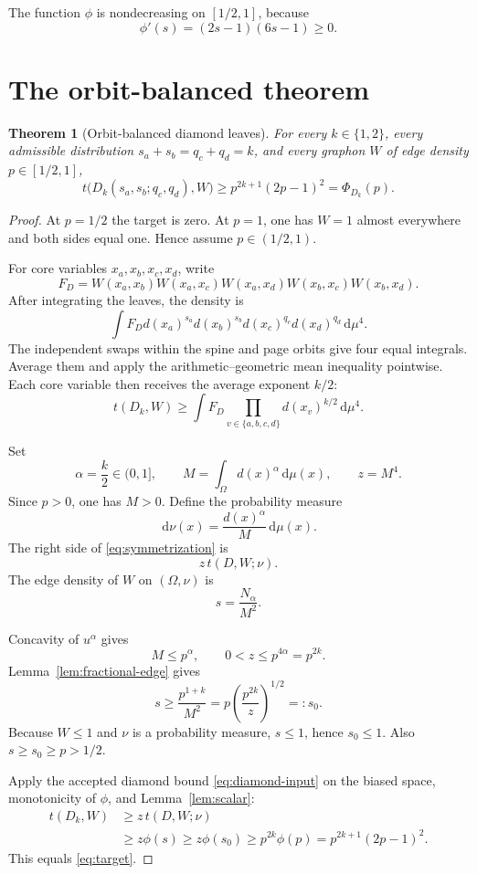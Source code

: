\documentclass[11pt]{article}
\newtheorem{theorem}{Theorem}[section]
\newcommand{\dd}{\,\mathrm d}
\begin{document}
The function $\phi$ is nondecreasing on $[1/2,1]$, because
\[
 \phi'(s)=(2s-1)(6s-1)\geq0.
\]


\section{The orbit-balanced theorem}

\begin{theorem}[Orbit-balanced diamond leaves]
\label{thm:main}
For every $k\in\{1,2\}$, every admissible distribution
$s_a+s_b=q_c+q_d=k$, and every graphon $W$ of edge density
$p\in[1/2,1]$,
\[
 \boxed{
 t\bigl(D_k(s_a,s_b;q_c,q_d),W\bigr)
 \geq p^{2k+1}(2p-1)^2
 =\Phi_{D_k}(p).
 }
\]
\end{theorem}

\begin{proof}
At $p=1/2$ the target is zero.  At $p=1$, one has $W=1$ almost everywhere
and both sides equal one.  Hence assume $p\in(1/2,1)$.

For core variables $x_a,x_b,x_c,x_d$, write
\[
 F_D=W(x_a,x_b)W(x_a,x_c)W(x_a,x_d)
     W(x_b,x_c)W(x_b,x_d).
\]
After integrating the leaves, the density is
\[
 \int F_D
 d(x_a)^{s_a}d(x_b)^{s_b}
 d(x_c)^{q_c}d(x_d)^{q_d}\dd\mu^4.
\]
The independent swaps within the spine and page orbits give four equal
integrals.  Average them and apply the arithmetic--geometric mean inequality
pointwise.  Each core variable then receives the average exponent $k/2$:
\begin{equation}
 t(D_k,W)
 \geq\int F_D\prod_{v\in\{a,b,c,d\}}d(x_v)^{k/2}\dd\mu^4.
 \label{eq:symmetrization}
\end{equation}

Set
\[
 \alpha=\frac k2\in(0,1],
 \qquad
 M=\int_\Omega d(x)^\alpha\dd\mu(x),
 \qquad
 z=M^4.
\]
Since $p>0$, one has $M>0$.  Define the probability measure
\[
 \dd\nu(x)=\frac{d(x)^\alpha}{M}\dd\mu(x).
\]
The right side of \eqref{eq:symmetrization} is
\[
 z\,t(D,W;\nu).
\]
The edge density of $W$ on $(\Omega,\nu)$ is
\[
 s=\frac{N_\alpha}{M^2}.
\]

Concavity of $u^\alpha$ gives
\[
 M\leq p^\alpha,
 \qquad 0<z\leq p^{4\alpha}=p^{2k}.
\]
Lemma~\ref{lem:fractional-edge} gives
\[
 s\geq\frac{p^{1+k}}{M^2}
 =p\left(\frac{p^{2k}}z\right)^{1/2}
 =:s_0.
\]
Because $W\leq1$ and $\nu$ is a probability measure, $s\leq1$, hence
$s_0\leq1$.  Also $s\geq s_0\geq p>1/2$.

Apply the accepted diamond bound \eqref{eq:diamond-input} on the biased
space, monotonicity of $\phi$, and Lemma~\ref{lem:scalar}:
\begin{align*}
 t(D_k,W)
 &\geq z\,t(D,W;\nu)\\
 &\geq z\phi(s)
 \geq z\phi(s_0)
 \geq p^{2k}\phi(p)
 =p^{2k+1}(2p-1)^2.
\end{align*}
This equals \eqref{eq:target}.
\end{proof}
\end{document}
